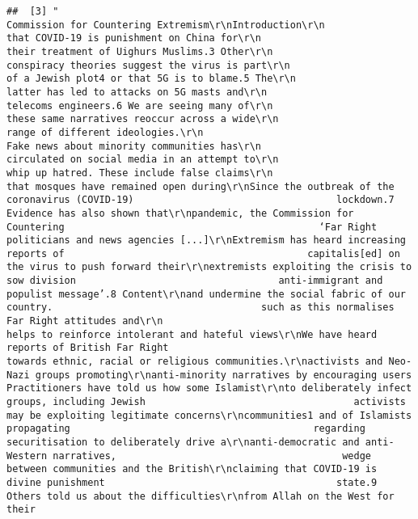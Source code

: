 \documentclass[
]{book}
\begin{document}
\begin{verbatim}
##  [3] "                                                    Commission for Countering Extremism\r\nIntroduction\r\n                                                                                   that COVID-19 is punishment on China for\r\n                                                                                   their treatment of Uighurs Muslims.3 Other\r\n                                                                                   conspiracy theories suggest the virus is part\r\n                                                                                   of a Jewish plot4 or that 5G is to blame.5 The\r\n                                                                                   latter has led to attacks on 5G masts and\r\n                                                                                   telecoms engineers.6 We are seeing many of\r\n                                                                                   these same narratives reoccur across a wide\r\n                                                                                   range of different ideologies.\r\n                                                                                   Fake news about minority communities has\r\n                                                                                   circulated on social media in an attempt to\r\n                                                                                   whip up hatred. These include false claims\r\n                                                                                   that mosques have remained open during\r\nSince the outbreak of the coronavirus (COVID-19)                                   lockdown.7 Evidence has also shown that\r\npandemic, the Commission for Countering                                            ‘Far Right politicians and news agencies [...]\r\nExtremism has heard increasing reports of                                          capitalis[ed] on the virus to push forward their\r\nextremists exploiting the crisis to sow division                                   anti-immigrant and populist message’.8 Content\r\nand undermine the social fabric of our country.                                    such as this normalises Far Right attitudes and\r\n                                                                                   helps to reinforce intolerant and hateful views\r\nWe have heard reports of British Far Right                                         towards ethnic, racial or religious communities.\r\nactivists and Neo-Nazi groups promoting\r\nanti-minority narratives by encouraging users                                      Practitioners have told us how some Islamist\r\nto deliberately infect groups, including Jewish                                    activists may be exploiting legitimate concerns\r\ncommunities1 and of Islamists propagating                                          regarding securitisation to deliberately drive a\r\nanti-democratic and anti-Western narratives,                                       wedge between communities and the British\r\nclaiming that COVID-19 is divine punishment                                        state.9 Others told us about the difficulties\r\nfrom Allah on the West for their 
\end{verbatim}
\end{document}
